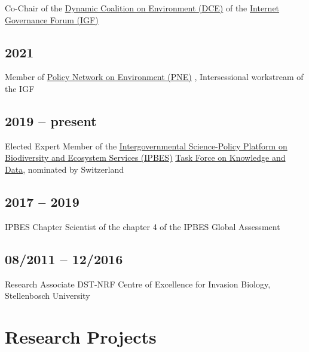\documentclass[a4paper]{article}
\begin{document}
Co-Chair of the \href{https://intgovforum.org/en/content/dynamic-coalition-on-environment-dce}{Dynamic Coalition on Environment (DCE)} of the \href{https://intgovforum.org/en}{Internet Governance Forum (IGF)}

\subsection{2021}

Member of \href{https://www.intgovforum.org/en/content/policy-network-on-environment-pne}{Policy Network on Environment (PNE)} , Intersessional workstream of the IGF

\subsection{2019 -- present}

Elected Expert Member of the \href{https://ipbes.net/}{Intergovernmental Science-Policy Platform on Biodiversity and Ecosystem Services (IPBES)} \href{https://ipbes.net/knowledge-data}{Task Force on Knowledge and Data}, nominated by Switzerland

\subsection{2017 -- 2019}

IPBES Chapter Scientist of the chapter 4 of the IPBES Global Assessment

\subsection{08/2011 -- 12/2016}

Research Associate DST-NRF Centre of Excellence for Invasion Biology, Stellenbosch University


\section{Research Projects}
\end{document}
